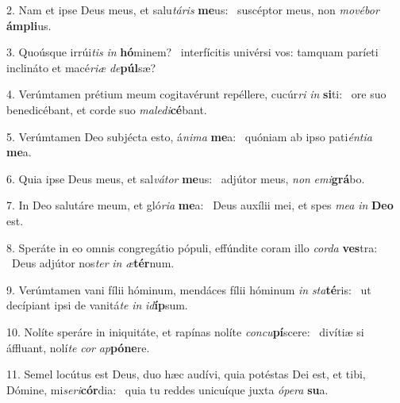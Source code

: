 2. Nam et ipse Deus meus, et salu\textit{tá}\textit{ris} \textbf{me}us: \ast\  suscéptor meus, non \textit{mo}\textit{vé}\textit{bor} \textbf{ám}\textbf{pli}us.\

3. Quoúsque irrúi\textit{tis} \textit{in} \textbf{hó}minem? \ast\  interfícitis univérsi vos: tamquam paríeti inclináto et macé\textit{ri}\textit{æ} \textit{de}\textbf{púl}sæ?\

4. Verúmtamen prétium meum cogitavérunt repéllere, cucúr\textit{ri} \textit{in} \textbf{si}ti: \ast\  ore suo benedicébant, et corde suo \textit{ma}\textit{le}\textit{di}\textbf{cé}bant.\

5. Verúmtamen Deo subjécta esto, á\textit{ni}\textit{ma} \textbf{me}a: \ast\  quóniam ab ipso pati\textit{én}\textit{ti}\textit{a} \textbf{me}a.\

6. Quia ipse Deus meus, et sal\textit{vá}\textit{tor} \textbf{me}us: \ast\  adjútor meus, \textit{non} \textit{e}\textit{mi}\textbf{grá}bo.\

7. In Deo salutáre meum, et gló\textit{ri}\textit{a} \textbf{me}a: \ast\  Deus auxílii mei, et spes \textit{me}\textit{a} \textit{in} \textbf{De}\textbf{o} est.\

8. Speráte in eo omnis congregátio pópuli, effúndite coram illo \textit{cor}\textit{da} \textbf{ves}tra: \ast\  Deus adjútor nos\textit{ter} \textit{in} \textit{æ}\textbf{tér}num.\

9. Verúmtamen vani fílii hóminum, mendáces fílii hóminum \textit{in} \textit{sta}\textbf{té}ris: \ast\  ut decípiant ipsi de vanitá\textit{te} \textit{in} \textit{id}\textbf{íp}sum.\

10. Nolíte speráre in iniquitáte, et rapínas nolíte \textit{con}\textit{cu}\textbf{pí}scere: \ast\  divítiæ si áffluant, nolí\textit{te} \textit{cor} \textit{ap}\textbf{pó}\textbf{ne}re.\

11. Semel locútus est Deus, duo hæc audívi, quia potéstas Dei est, et tibi, Dómine, mi\textit{se}\textit{ri}\textbf{cór}dia: \ast\  quia tu reddes unicuíque juxta \textit{ó}\textit{pe}\textit{ra} \textbf{su}a.\

